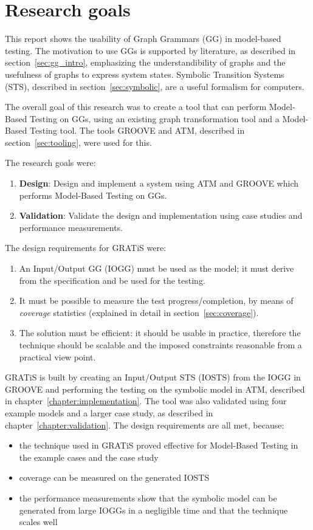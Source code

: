 \section{Research goals}
This report shows the usability of Graph Grammars (GG) in model-based testing. The motivation to use GGs is supported by literature, as described in section~\ref{sec:gg_intro}, emphasizing the understandibility of graphs and the usefulness of graphs to express system states. Symbolic Transition Systems (STS), described in section~\ref{sec:symbolic}, are a useful formalism for computers. 

The overall goal of this research was to create a tool that can perform Model-Based Testing on GGs, using an existing graph transformation tool and a Model-Based Testing tool. The tools GROOVE and ATM, described in section~\ref{sec:tooling}, were used for this.

The research goals were:
\begin{enumerate}
  \item \textbf{Design}: Design and implement a system using ATM and GROOVE which performs Model-Based Testing on GGs.
  \item \textbf{Validation}: Validate the design and implementation using case studies and performance measurements.
\end{enumerate}

The design requirements for GRATiS were: 
\begin{enumerate}
\item An Input/Output GG (IOGG) must be used as the model; it must derive from the specification and be used for the testing.
\item It must be possible to measure the test progress/completion, by means of \textit{coverage} statistics (explained in detail in section~\ref{sec:coverage}).
\item The solution must be efficient: it should be usable in practice, therefore the technique should be scalable and the imposed constraints reasonable from a practical view point.
\end{enumerate}

GRATiS is built by creating an Input/Output STS (IOSTS) from the IOGG in GROOVE and performing the testing on the symbolic model in ATM, described in chapter~\ref{chapter:implementation}. The tool was also validated using four example models and a larger case study, as described in chapter~\ref{chapter:validation}. The design requirements are all met, because:
\begin{itemize} 
\item the technique used in GRATiS proved effective for Model-Based Testing in the example cases and the case study
\item coverage can be measured on the generated IOSTS
\item the performance measurements show that the symbolic model can be generated from large IOGGs in a negligible time and that the technique scales well
\end{itemize}

